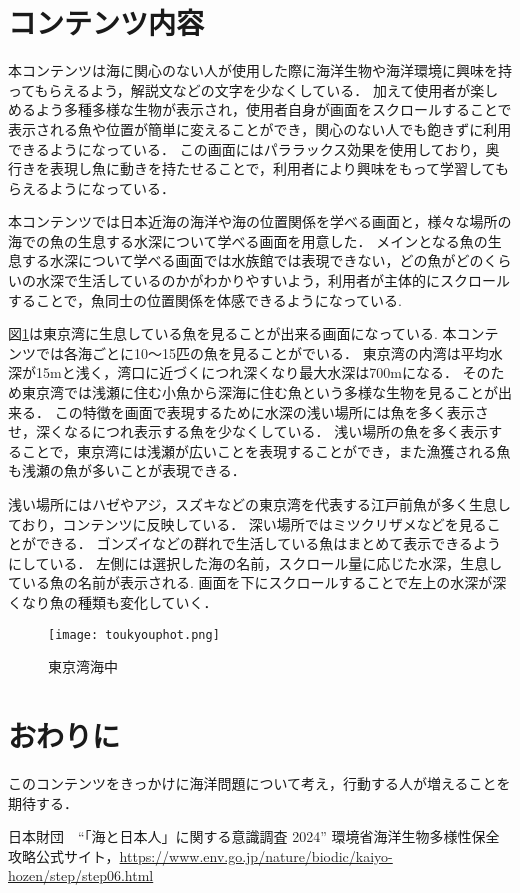 \documentclass[twocolumn,a4j,10pt]{ltjsarticle}
\begin{document}
\section{コンテンツ内容}
\label{sec:description3}
本コンテンツは海に関心のない人が使用した際に海洋生物や海洋環境に興味を持ってもらえるよう，解説文などの文字を少なくしている．
加えて使用者が楽しめるよう多種多様な生物が表示され，使用者自身が画面をスクロールすることで表示される魚や位置が簡単に変えることができ，関心のない人でも飽きずに利用できるようになっている．
この画面にはパララックス効果を使用しており，奥行きを表現し魚に動きを持たせることで，利用者により興味をもって学習してもらえるようになっている．\par
本コンテンツでは日本近海の海洋や海の位置関係を学べる画面と，様々な場所の海での魚の生息する水深について学べる画面を用意した．
メインとなる魚の生息する水深について学べる画面では水族館では表現できない，どの魚がどのくらいの水深で生活しているのかがわかりやすいよう，利用者が主体的にスクロールすることで，魚同士の位置関係を体感できるようになっている.\par
図\ref{fig:東京}は東京湾に生息している魚を見ることが出来る画面になっている.
本コンテンツでは各海ごとに10〜15匹の魚を見ることがでいる．
東京湾の内湾は平均水深が15mと浅く，湾口に近づくにつれ深くなり最大水深は700mになる．
そのため東京湾では浅瀬に住む小魚から深海に住む魚という多様な生物を見ることが出来る．
この特徴を画面で表現するために水深の浅い場所には魚を多く表示させ，深くなるにつれ表示する魚を少なくしている．
浅い場所の魚を多く表示することで，東京湾には浅瀬が広いことを表現することができ，また漁獲される魚も浅瀬の魚が多いことが表現できる．\par
浅い場所にはハゼやアジ，スズキなどの東京湾を代表する江戸前魚が多く生息しており，コンテンツに反映している．
深い場所ではミツクリザメなどを見ることができる．
ゴンズイなどの群れで生活している魚はまとめて表示できるようにしている．
左側には選択した海の名前，スクロール量に応じた水深，生息している魚の名前が表示される.
画面を下にスクロールすることで左上の水深が深くなり魚の種類も変化していく．
\begin{figure}[h]
\begin{center}
 \texttt{[image: toukyouphot.png]}
\end{center}
 \caption{東京湾海中}
 \label{fig:東京}
\end{figure}




\section{おわりに}
\label{sec:description3}
このコンテンツをきっかけに海洋問題について考え，行動する人が増えることを期待する．

\begin{thebibliography}{99}
日本財団　“「海と日本人」に関する意識調査 2024”
環境省海洋生物多様性保全攻略公式サイト，\url{https://www.env.go.jp/nature/biodic/kaiyo-hozen/step/step06.html}
\end{thebibliography}
\end{document}
